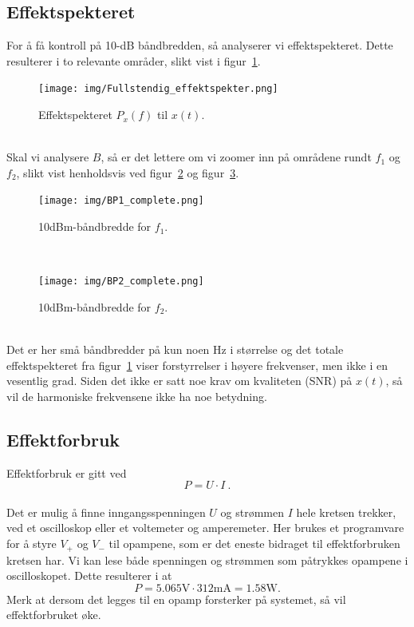 \documentclass[a4paper,11pt,norsk]{article}
\begin{document}
\subsection{Effektspekteret}
For å få kontroll på 10-dB båndbredden, så analyserer vi effektspekteret. Dette resulterer i to relevante områder, slikt vist i figur~\ref{fig: effektspekteret}. \\
\begin{figure}[!htbp]
    \centering
    \texttt{[image: img/Fullstendig\_effektspekter.png]}
    \caption{Effektspekteret $P_x(f)$ til $x(t)$.}
    \label{fig: effektspekteret}
\end{figure} \\
Skal vi analysere $B$, så er det lettere om vi zoomer inn på områdene rundt $f_1$ og $f_2$, slikt vist henholdsvis ved figur~\ref{fig: 10dBm for f_1} og figur~\ref{fig: 10dBm for f_2}. \\
\begin{figure}[!htbp]
    \centering
    \texttt{[image: img/BP1\_complete.png]}
    \caption{10dBm-båndbredde for $f_1$.}
    \label{fig: 10dBm for f_1}
\end{figure} \\
\begin{figure}[!htbp]
    \centering
    \texttt{[image: img/BP2\_complete.png]}
    \caption{10dBm-båndbredde for $f_2$.}
    \label{fig: 10dBm for f_2}
\end{figure} \\
Det er her små båndbredder på kun noen Hz i størrelse og det totale effektspekteret fra figur~\ref{fig: effektspekteret} viser forstyrrelser i høyere frekvenser, men ikke i en vesentlig grad. Siden det ikke er satt noe krav om kvaliteten (SNR) på $x(t)$, så vil de harmoniske frekvensene ikke ha noe betydning.
\\
\subsection{Effektforbruk}
Effektforbruk er gitt ved
\begin{equation}
    P = U \cdot I \: .
\end{equation} \\
Det er mulig å finne inngangsspenningen $U$ og strømmen $I$ hele kretsen trekker, ved et oscilloskop eller et voltemeter og amperemeter. Her brukes et programvare for å styre $V_+$ og $V_-$ til opampene, som er det eneste bidraget til effektforbruken kretsen har. Vi kan lese både spenningen og strømmen som påtrykkes opampene i oscilloskopet. Dette resulterer i at 
\begin{equation*}
    P = 5.065\textrm{V} \cdot 312\textrm{mA} = 1.58\textrm{W}.
\end{equation*}
Merk at dersom det legges til en opamp forsterker på systemet, så vil effektforbruket øke.
\end{document}
